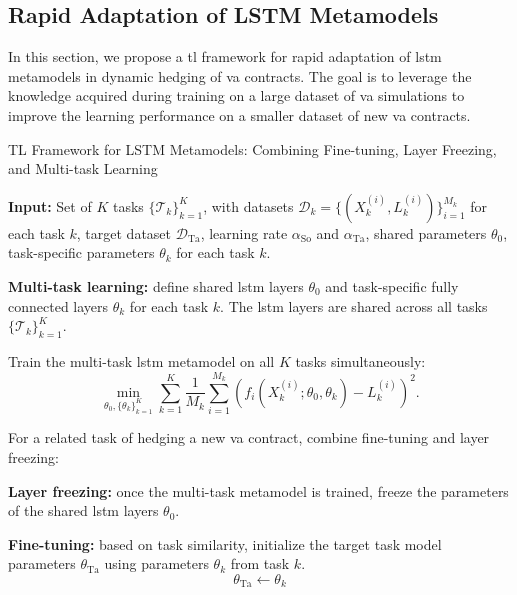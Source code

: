 \subsection{Rapid Adaptation of LSTM Metamodels} \label{sec3:transfer_learning}

In this section, we propose a \gls{tl} framework for rapid adaptation of \gls{lstm} metamodels in dynamic hedging of \gls{va} contracts.
The goal is to leverage the knowledge acquired during training on a large dataset of \gls{va} simulations to improve the learning performance on a smaller dataset of new \gls{va} contracts.


\begin{algorithm}
    \caption{TL Framework for LSTM Metamodels: Combining Fine-tuning, Layer Freezing, and Multi-task Learning}
    \begin{algorithmic}[1] \label{alg3:combined}
        \STATE \textbf{Input:} Set of $K$ tasks $\{\mathcal{T}_k\}_{k=1}^K$, with datasets $\mathcal{D}_k = \{(X_k^{(i)}, L_k^{(i)})\}_{i=1}^{M_k}$ for each task $k$, target dataset $\mathcal{D}_{\text{Ta}}$, learning rate $\alpha_{\text{So}}$ and $\alpha_{\text{Ta}}$, shared parameters $\theta_0$, task-specific parameters $\theta_k$ for each task $k$.
        
        \STATE \textbf{Multi-task learning:} define shared \gls{lstm} layers $\theta_0$ and task-specific fully connected layers $\theta_k$ for each task $k$. The \gls{lstm} layers are shared across all tasks $\{\mathcal{T}_k\}_{k=1}^K$.
        
        \STATE Train the multi-task \gls{lstm} metamodel on all $K$ tasks simultaneously:
        \begin{equation}
            \min_{\theta_0, \{\theta_k\}_{k=1}^K} \sum_{k=1}^K \frac{1}{M_k} \sum_{i=1}^{M_k} \left( f_i(X_k^{(i)}; \theta_0, \theta_k) - L_k^{(i)} \right)^2.
        \end{equation}
        
        \STATE For a related task of hedging a new \gls{va} contract, combine fine-tuning and layer freezing:

        \STATE \textbf{Layer freezing:} once the multi-task metamodel is trained, freeze the parameters of the shared \gls{lstm} layers $\theta_0$.
        
        \STATE \textbf{Fine-tuning:}  based on task similarity, initialize the target task model parameters $\theta_{\text{Ta}}$ using parameters $\theta_k$ from task $k$.
        \[
        \theta_{\text{Ta}} \gets \theta_k 
        \]
        

\end{algorithmic}
\end{algorithm}
